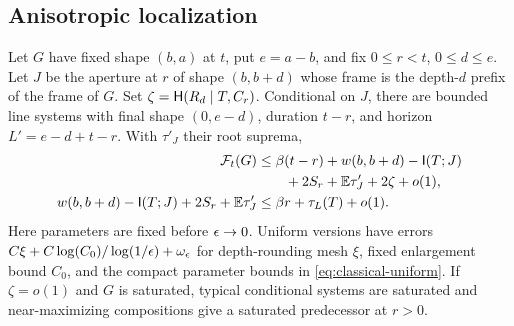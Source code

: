 \subsection{Anisotropic localization}

\begin{lemma}
\label{lem:classical-localization}
Let $G$ have fixed shape $(b,a)$ at $t$, put $e=a-b$, and fix
$0\le r<t$, $0\le d\le e$.  Let $J$ be the aperture at $r$ of shape
$(b,b+d)$ whose frame is the depth-$d$ prefix of the frame of $G$.
Set $\zeta=\mathsf H(R_d\mid T,C_r)$.  Conditional on $J$, there are bounded
line systems with final shape $(0,e-d)$, duration $t-r$, and horizon
$L'=e-d+t-r$.  With $\tau'_J$ their root suprema,
\begin{align}
 \mathcal F_t(G)
 &\le\beta(t-r)+w(b,b+d)-\mathsf I(T;J)\notag\\
 &\qquad{}+2S_r+\mathbb E\tau'_J+2\zeta+o(1),
 \label{eq:classical-local-first}\\
 w(b,b+d)-\mathsf I(T;J)+2S_r+\mathbb E\tau'_J
 &\le\beta r+\tau_L(T)+o(1).
 \label{eq:classical-local-second}
\end{align}
Here parameters are fixed before $\epsilon\to0$.  Uniform versions have
errors $C\xi+C\log(C_0)/\log(1/\epsilon)+\omega_\epsilon$ for depth-rounding
mesh $\xi$, fixed enlargement bound $C_0$, and the compact parameter
bounds in \eqref{eq:classical-uniform}.  If $\zeta=o(1)$ and $G$ is
saturated, typical conditional systems are saturated and near-maximizing
compositions give a saturated predecessor at $r>0$.
\end{lemma}

